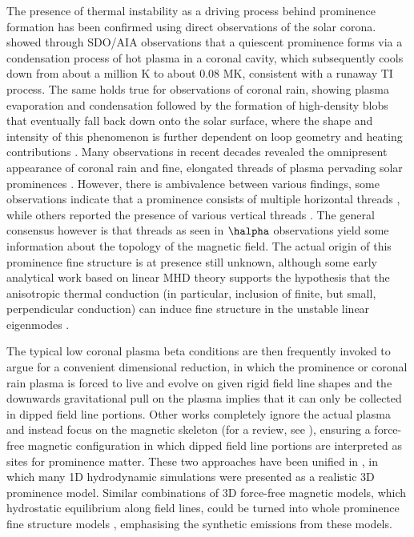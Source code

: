 The presence of thermal instability as a driving process behind prominence formation has been confirmed using direct observations of the solar corona. \citet{berger2012} showed through SDO/AIA observations that a quiescent prominence forms via a condensation process of hot plasma in a coronal cavity, which subsequently cools down from about a million K to about 0.08 MK, consistent with a runaway TI process. The same holds true for observations of coronal rain, showing plasma evaporation and condensation followed by the formation of high-density blobs that eventually fall back down onto the solar surface, where the shape and intensity of this phenomenon is further dependent on loop geometry and heating contributions \citep{auchere2018}. Many observations in recent decades revealed the omnipresent appearance of coronal rain \citep{kamio2011,antolin2015} and fine, elongated threads of plasma pervading solar prominences \citep{engvold1998,mackay2010}. However, there is ambivalence between various findings, some observations indicate that a prominence consists of multiple horizontal threads \citep{casini2003,okamoto2007}, while others reported the presence of various vertical threads \citep{berger2008}. The general consensus however is that threads as seen in $\halpha$ observations yield some information about the topology of the magnetic field. The actual origin of this prominence fine structure is at presence still unknown, although some early analytical work based on linear MHD theory supports the hypothesis that the anisotropic thermal conduction (in particular, inclusion of finite, but small, perpendicular conduction) can induce fine structure in the unstable linear eigenmodes \citep{vanderlinden1991}.

The typical low coronal plasma beta conditions are then frequently invoked to argue for a convenient dimensional reduction, in which the prominence or coronal rain plasma is forced to live and evolve on given rigid field line shapes and the downwards gravitational pull on the plasma implies that it can only be collected in dipped field line portions. Other works completely ignore the actual plasma and instead focus on the magnetic skeleton (for a review, see \citep{gibson2018}), ensuring a force-free magnetic configuration in which dipped field line portions are interpreted as sites for prominence matter. These two approaches have been unified in \citet{luna2012}, in which many 1D hydrodynamic simulations were presented as a realistic 3D prominence model. Similar combinations of 3D force-free magnetic models, which hydrostatic equilibrium along field lines, could be turned into whole prominence fine structure models \citep{gunar2015}, emphasising the synthetic emissions from these models.

